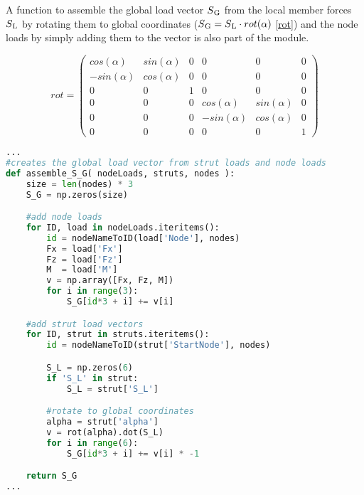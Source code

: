 A function to assemble the global load vector $S\textsubscript{G}$ from the local member forces $S\textsubscript{L}$ by rotating them to global coordinates ($S\textsubscript{G} = S\textsubscript{L} \cdot rot(\alpha)$ \ref{rot}) and the node loads by simply adding them to the vector is also part of the module.

\begin{equation} \label{rot}
rot = \begin{pmatrix}
cos(\alpha)  & sin(\alpha)  & 0   & 0             & 0             & 0   \\[0.2em]
-sin(\alpha) & cos(\alpha)  & 0   & 0             & 0             & 0   \\[0.2em]
0            & 0            & 1   & 0             & 0             & 0   \\[0.2em]
0            & 0            & 0   & cos(\alpha)   & sin(\alpha)   & 0   \\[0.2em]
0            & 0            & 0   & -sin(\alpha)  & cos(\alpha)   & 0   \\[0.2em]
0            & 0            & 0   & 0             & 0             & 1
     \end{pmatrix}
\end{equation}

\begin{inconsolata}
\begin{lstlisting}[language=python]
...
#creates the global load vector from strut loads and node loads
def assemble_S_G( nodeLoads, struts, nodes ):
    size = len(nodes) * 3
    S_G = np.zeros(size)

    #add node loads
    for ID, load in nodeLoads.iteritems():
        id = nodeNameToID(load['Node'], nodes)
        Fx = load['Fx']
        Fz = load['Fz']
        M  = load['M']
        v = np.array([Fx, Fz, M])
        for i in range(3):
            S_G[id*3 + i] += v[i]

    #add strut load vectors
    for ID, strut in struts.iteritems():
        id = nodeNameToID(strut['StartNode'], nodes)

        S_L = np.zeros(6)
        if 'S_L' in strut:
            S_L = strut['S_L']

        #rotate to global coordinates
        alpha = strut['alpha']
        v = rot(alpha).dot(S_L)
        for i in range(6):
            S_G[id*3 + i] += v[i] * -1

    return S_G
...
\end{lstlisting}
\end{inconsolata}

